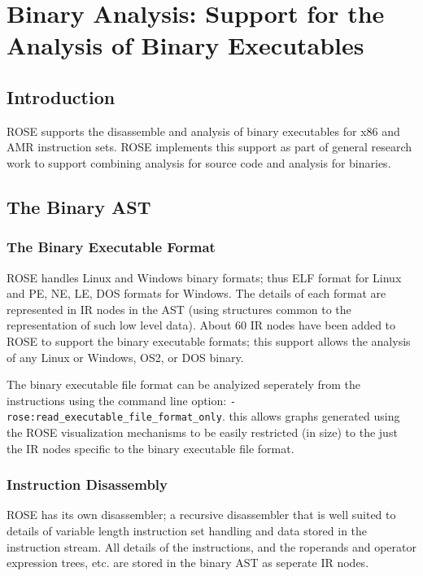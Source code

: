 
\chapter{Binary Analysis: Support for the Analysis of Binary Executables}

\label{binaryAnalysis::overview}

\section{Introduction}

   ROSE supports the disassemble and analysis of binary executables for x86 and AMR
instruction sets.  ROSE implements this support as part of general research work
to support combining analysis for source code and analysis for binaries.  

\section{The Binary AST}

\subsection{The Binary Executable Format}

    ROSE handles Linux and Windows binary formats; thus ELF format for Linux and PE, NE,
LE, DOS formats for Windows.  The details of each format are represented in IR nodes in
the AST (using structures common to the representation of such low level data).  About
60 IR nodes have been added to ROSE to support the binary executable formats; this
support allows the analysis of any Linux or Windows, OS\/2, or DOS binary.

The binary executable file format can be analyized seperately from the instructions
using the command line option: {\tt -rose:read\_executable\_file\_format\_only}.  this
allows graphs generated using the ROSE visualization mechanisms to be easily restricted 
(in size) to the just the IR nodes specific to the binary executable file format.

\subsection{Instruction Disassembly}

    ROSE has its own disassembler; a recursive disassembler that is well suited to
details of variable length instruction set handling and data stored in the instruction
stream.  All details of the instructions, and the roperands and operator expression trees,
etc. are stored in the binary AST as seperate IR nodes.

